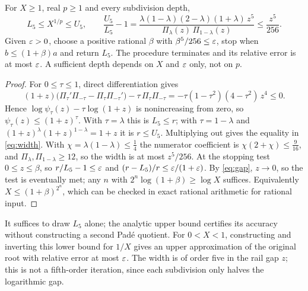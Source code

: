\begin{proposition}\label{prop:enclosure}
For $X\ge1$, real $p\ge1$ and every subdivision depth,
\begin{equation}\label{eq:width}
L_5\le X^{1/p}\le U_5,\qquad
\frac{U_5}{L_5}-1=\frac{\lambda(1-\lambda)(2-\lambda)(1+\lambda)\,z^{5}}{\Pi_\lambda(z)\,\Pi_{1-\lambda}(z)}
\le\frac{z^{5}}{256}.
\end{equation}
Given $\varepsilon>0$, choose a positive rational $\beta$ with $\beta^{5}/256\le\varepsilon$, stop when
$b\le(1+\beta)a$ and return $L_5$. The procedure terminates and its relative error is at most $\varepsilon$.
A sufficient depth depends on $X$ and $\varepsilon$ only, not on $p$.
\end{proposition}
\begin{proof}
For $0\le\tau\le1$, direct differentiation gives
\[ (1+z)\bigl(\Pi_\tau'\Pi_{-\tau}-\Pi_\tau\Pi_{-\tau}'\bigr)-\tau\,\Pi_\tau\Pi_{-\tau}
=-\tau(1-\tau^{2})(4-\tau^{2})\,z^{4}\le0. \]
Hence $\log\psi_\tau(z)-\tau\log(1+z)$ is nonincreasing from zero, so
$\psi_\tau(z)\le(1+z)^{\tau}$. With $\tau=\lambda$ this is $L_5\le r$; with $\tau=1-\lambda$ and
$(1+z)^{\lambda}(1+z)^{1-\lambda}=1+z$ it is $r\le U_5$. Multiplying out gives the equality in
\eqref{eq:width}. With $\chi=\lambda(1-\lambda)\le\tfrac14$ the numerator coefficient is
$\chi(2+\chi)\le\tfrac9{16}$, and $\Pi_\lambda,\Pi_{1-\lambda}\ge12$, so the width is at most
$z^{5}/256$. At the stopping test $0\le z\le\beta$, so $r/L_5-1\le\varepsilon$ and $(r-L_5)/r\le\varepsilon/(1+\varepsilon)$. By \eqref{eq:gap}, $z\to0$,
so the test is eventually met; any $n$ with $2^{n}\log(1+\beta)\ge\log X$ suffices. Equivalently
$X\le(1+\beta)^{2^{n}}$, which can be checked in exact rational arithmetic for rational input.
\end{proof}

It suffices to draw $L_5$ alone; the analytic upper bound certifies its accuracy without constructing
a second Pad\'e quotient. For $0<X<1$, constructing and inverting this lower bound for $1/X$ gives an
upper approximation of the original root with relative error at most $\varepsilon$. The width is of order
five in the rail gap $z$; this is not a fifth-order iteration, since each subdivision only halves the
logarithmic gap.

